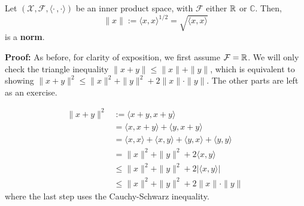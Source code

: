     \Qed
    
\vspace*{.2cm}

\begin{cor}
Let $(\mathcal{X}, \mathcal{F}, \langle \cdot\,,\cdot \rangle)$ be an inner product space, with $\mathcal{F}$ either $\mathbb R $ or $\mathbb{C}$. Then, $$\|x\| :=  \langle x,x \rangle ^{1/2} = \sqrt{ \langle x,x \rangle }$$
is a \textbf{norm}.
\end{cor} 

\textbf{Proof:} As before,  for clarity of exposition, we first assume $\mathcal{F} =\mathbb R$. We will only check the triangle inequality $\|x+y\| \leq \|x\| +\|y\|$, which is equivalent to showing $ \|x+y\|^2 \leq \|x\|^2 + \|y\|^2 + 2\|x\| \cdot \|y\|$. The other parts are left as an exercise.

    \begin{align*}
               \|x+y\|^2 &:=  \langle x+y,x+y \rangle  \\
        &=  \langle x,x+y \rangle  +  \langle y, x+y \rangle  \\
        &=  \langle x,x \rangle  + \langle x,y \rangle  +  \langle y,x \rangle +  \langle y,y \rangle  \\
        &= \|x\|^2 + \|y\|^2 +2 \langle x,y \rangle  \\
        &\leq \|x\|^2 + \|y\|^2 + 2\left| \langle x,y \rangle \right| \\
        &\leq \|x\|^2 + \|y\|^2 + 2\|x\| \cdot \|y\|\, 
    \end{align*}
    where the last step uses the Cauchy-Schwarz inequality.  \\
    
